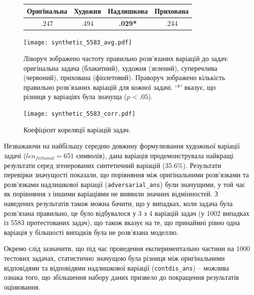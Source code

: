 \begin{figure}[ht]
    \centering
    \label{tab:sign_test}
    \begin{tabular}{|c|c|c|c|}
    \hline
    Оригінальна & Художня & Надлишкова & Прихована \\
    \hline
    .247 & .494 & \textbf{.029*} & .244 \\
    \hline
    \end{tabular}
\end{figure}

\begin{figure}[ht]
    \centering
    \texttt{[image: synthetic\_5583\_avg.pdf]}
    \caption{Ліворуч зображено частоту правильно розв'язаних варіацій до задач: оригінальна задача (блакитний), художня (зелений), суперечлива (червоний), прихована (фіолетовий). Праворуч зображено кількість правильно розв'язаних варіацій для кожної задачі. `*' вказує, що різниця у варіаціях була значуща ($p < .05$).}
    \label{fig:versions}
\end{figure}

\begin{figure}[ht]
    \centering
    \texttt{[image: synthetic\_5583\_corr.pdf]}
    \caption{Коефіцієнт кореляції варіацій задач.}
    \label{fig:corr}
\end{figure}

Незважаючи на найбільшу середню довжину формулювання художньої варіації задачі ($len_{fictional}=651$ символів), дана варіація продемонструвала найкращі результати серед згенерованих синтетичний варіацій (35.6\%). Результати перевірки значущості показали, що порівняння між оригінальними розв'язками та розв'язками надлишкової варіації (\texttt{adversarial\_ans}) були значущими, у той час як порівняння з іншими варіаціями не виявили значних відмінностей. З наведених результатів також можна бачити, що у випадках, коли задача була розв'язана правильно, це було відбувалося у 3 з 4 варіацій задач (у 1002 випадках із 5583 протестованих задач), що також вказує на те, що принаймні рівно одна варіація у більшості випадків була не розв'язана моделлю.

Окремо слід зазначити, що під час проведення експериментально частини на 1000 тестових задачах, статистично значущою була різниця між оригінальними відповідями та відповідями надлишкової варіації (\texttt{contdis\_ans}) -- можлива ознака того, що збільшення набору даних призвело до покращення результатів оцінювання.

